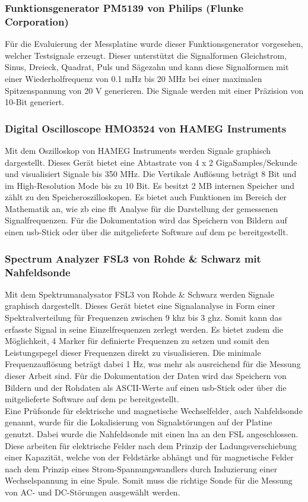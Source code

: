 \subsubsection*{Funktionsgenerator PM5139 von Philips (Flunke Corporation)}\label{sec:funktionsgen}
Für die Evaluierung der Messplatine wurde dieser Funktionsgenerator vorgesehen, welcher Testsignale erzeugt. Dieser unterstützt die Signalformen Gleichstrom, Sinus, Dreieck, Quadrat, Puls und Sägezahn und kann diese Signalformen mit einer Wiederholfrequenz von 0.1 mHz bis 20 MHz bei einer maximalen Spitzenspannung von 20 V generieren. Die Signale werden mit einer Präzision von 10-Bit generiert. \cite{flunkePM5139}

\subsubsection*{Digital Oscilloscope HMO3524 von HAMEG Instruments}\label{sec:oszi}
Mit dem Oszilloskop von HAMEG Instruments werden Signale graphisch dargestellt. Dieses Gerät bietet eine Abtastrate von 4 x 2 GigaSamples/Sekunde und visualisiert Signale bis 350 MHz. Die Vertikale Auflösung beträgt 8 Bit und im High-Resolution Mode bis zu 10 Bit. Es besitzt 2 MB internen Speicher und zählt zu den Speicheroszilloskopen. Es bietet auch Funktionen im Bereich der Mathematik an, wie \ac{zb} eine \ac{fft} Analyse für die Darstellung der gemessenen Signalfrequenzen. Für die Dokumentation wird das Speichern von Bildern auf einen \ac{usb}-Stick oder über die mitgelieferte Software auf dem \ac{pc} bereitgestellt. \cite{hamegHMO}

\subsubsection*{Spectrum Analyzer FSL3 von Rohde \& Schwarz mit Nahfeldsonde}\label{sec:analyzer}
Mit dem Spektrumanalysator FSL3 von Rohde \& Schwarz werden Signale graphisch dargestellt. Dieses Gerät bietet eine Signalanalyse in Form einer Spektralverteilung für Frequenzen zwischen 9 \ac{khz} bis 3 \ac{ghz}. Somit kann das erfasste Signal in seine Einzelfrequenzen zerlegt werden. Es bietet zudem die Möglichkeit, 4 Marker für definierte Frequenzen zu setzen und somit den Leistungspegel dieser Frequenzen direkt zu visualisieren. Die minimale Frequenzauflösung beträgt dabei 1 Hz, was mehr als ausreichend für die Messung dieser Arbeit sind. Für die Dokumentation der Daten wird das Speichern von Bildern und der Rohdaten als ASCII-Werte auf einen \ac{usb}-Stick oder über die mitgelieferte Software auf dem \ac{pc} bereitgestellt. \cite{rohdeFSL3}\\
Eine Prüfsonde für elektrische und magnetische Wechselfelder, auch Nahfeldsonde genannt, wurde für die Lokalisierung von Signalstörungen auf der Platine genutzt. Dabei wurde die Nahfeldsonde mit einen \ac{lna} an den FSL angeschlossen. Diese arbeiten für elektrische Felder nach dem Prinzip der Ladungsverschiebung einer Kapazität, welche von der Feldstärke abhängt und für magnetische Felder nach dem Prinzip eines Strom-Spannungswandlers durch Induzierung einer Wechselspannung in eine Spule. Somit muss die richtige Sonde für die Messung von AC- und DC-Störungen ausgewählt werden.

